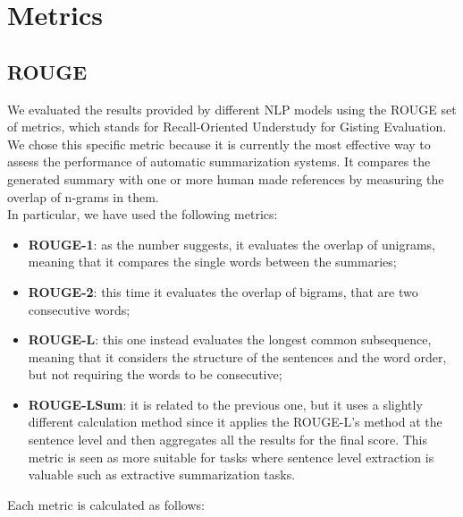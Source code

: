 \documentclass[10pt,twocolumn,letterpaper]{article}
\begin{document}
\section{Metrics}
\subsection{ROUGE}
We evaluated the results provided by different NLP models using the ROUGE set of metrics, which stands for Recall-Oriented Understudy for Gisting Evaluation. We chose this specific metric because it is currently the most effective way to assess the performance of automatic summarization systems. It compares the generated summary with one or more human made references by measuring the overlap of n-grams in them. \\
In particular, we have used the following metrics:
\begin{itemize}
    \item \textbf{ROUGE-1}: as the number suggests, it evaluates the overlap of unigrams, meaning that it compares the single words between the summaries;
    \item \textbf{ROUGE-2}: this time it evaluates the overlap of bigrams, that are two consecutive words;
    \item \textbf{ROUGE-L}: this one instead evaluates the longest common subsequence, meaning that it considers the structure of the sentences and the word order, but not requiring the words to be consecutive;
    \item \textbf{ROUGE-LSum}: it is related to the previous one, but it uses a slightly different calculation method since it applies the ROUGE-L's method at the sentence level and then aggregates all the results for the final score. This metric is seen as more suitable for tasks where sentence level extraction is valuable such as extractive summarization tasks.
\end{itemize}
Each metric is calculated as follows:
\end{document}
